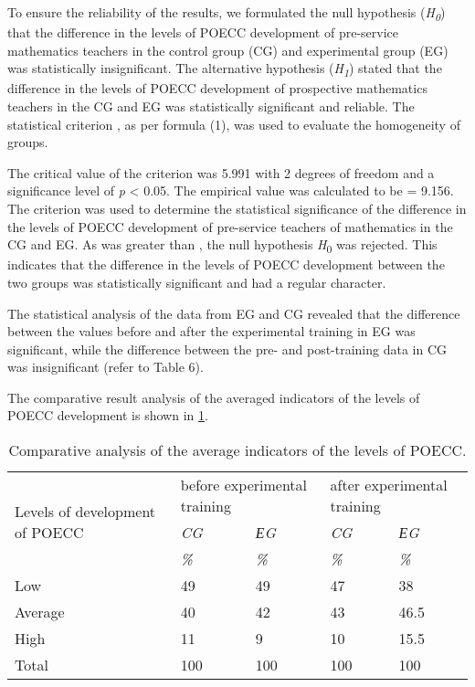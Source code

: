 To ensure the reliability of the results, we formulated the null
hypothesis (\emph{H}\textsubscript{\emph{0}}) that the difference in the
levels of POECC development of pre-service mathematics teachers in the
control group (CG) and experimental group (EG) was statistically
insignificant. The alternative hypothesis
(\emph{H}\textsubscript{\emph{1}}) stated that the difference in the
levels of POECC development of prospective mathematics teachers in the
CG and EG was statistically significant and reliable. The statistical
criterion , as per formula (1), was used to evaluate the homogeneity of
groups.



The critical value of the criterion was 5.991 with 2 degrees of freedom
and a significance level of \emph{p} \textless{} 0.05. The empirical
value was calculated to be = 9.156. The criterion was used to determine
the statistical significance of the difference in the levels of POECC
development of pre-service teachers of mathematics in the CG and EG. As
was greater than , the null hypothesis \emph{H}\textsubscript{0} was
rejected. This indicates that the difference in the levels of POECC
development between the two groups was statistically significant and had
a regular character.



The statistical analysis of the data from EG and CG revealed that the
difference between the values before and after the experimental training
in EG was significant, while the difference between the pre- and
post-training data in CG was insignificant (refer to Table 6).
	
The comparative result analysis of the averaged indicators of the levels of POECC development is shown in \cref{tab-05}.
	
\begin{table}[!htpb]
\centering
\begin{threeparttable}
\caption{Comparative analysis of the average indicators of the levels of POECC.}
\label{tab-05}
\begin{tabular}{l l l l l}
\toprule
\multicolumn{1}{p{3cm}}{\multirow{3}{=}{Levels of development of POECC}} & \multicolumn{2}{p{3cm}}{before experimental training} & \multicolumn{2}{p{3cm}}{after experimental training} \\
& \emph{CG} & \emph{ЕG} & \emph{CG} & \emph{ЕG}  \\
& \emph{\%} & \emph{\%} & \emph{\%} & \emph{\%}  \\
\midrule
Low & 49 & 49 & 47 & 38 \\
Average & 40 & 42 & 43 & 46.5 \\
High & 11 & 9 & 10 & 15.5 \\
Total & 100 & 100 & 100 & 100 \\
\bottomrule
\end{tabular}
\end{threeparttable}
\end{table}
	
